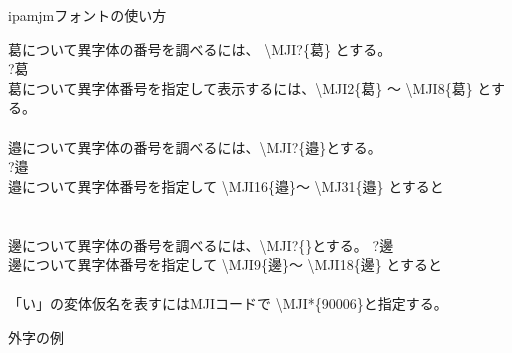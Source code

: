 \documentclass[
%
book,           %
tate,           %
twocolumn,      %
column_gap=3zw, %
paper=a4paper,  %
fontsize=17Q,   %
jafontsize=17Q, %
gutter=30mm,    %
fore-edge=25mm, %
head_space=30mm,%
foot_space=30mm,%
% 
endnote_position={_section}     %
]{jlreq}
\begin{document}
\newpage
{\ipamjm
ipamjmフォントの使い方

\vspace{12pt}
葛について異字体の番号を調べるには、 \textbackslash MJI?\{葛\} とする。\\
{\Large \MJI?{葛} }\\

葛について異字体番号を指定して表示するには、\textbackslash MJI2\{葛\} ～
\textbackslash MJI8\{葛\} とする。 \\
{\Large {}           }\\

邉について異字体の番号を調べるには、\textbackslash MJI?\{邉\}とする。\\
{\Large \MJI?{邉} }\\

邉について異字体番号を指定して
\textbackslash MJI16\{邉\}～ \textbackslash MJ31\{邉\} とすると \\
{\Large {}          
  }\\
{\Large {}          
  }\\

邊について異字体の番号を調べるには、\textbackslash MJI?\{\}とする。
{\Large \MJI?{邊}} \\

邊について異字体番号を指定して
\textbackslash MJI9\{邊\}～ \textbackslash MJI18\{邊\} とすると \\
{\Large {}          
      }\\


「い」の変体仮名を表すにはMJIコードで
\textbackslash MJI*\{90006\}と指定する。

\vspace{12pt}
\hspace{24pt}
{\LARGE {}}
}

\vspace{24mm}
外字の例

\vspace{4mm}
{\Large
{}
}
\end{document}
